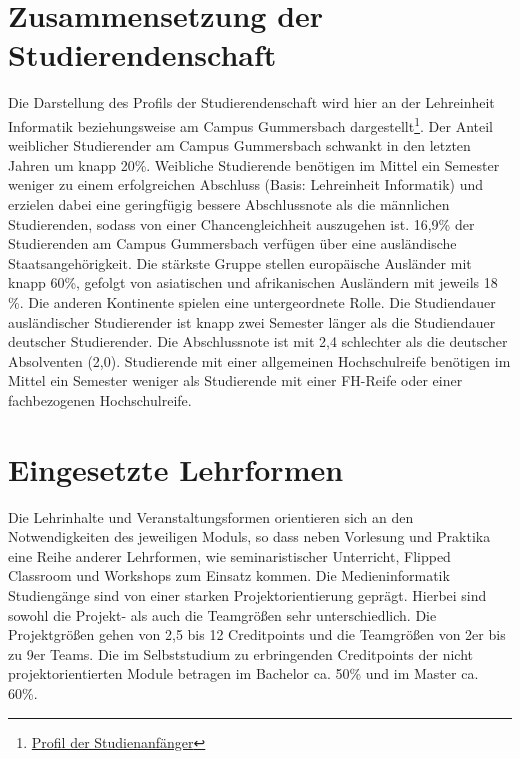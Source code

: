 \section{Zusammensetzung der
Studierendenschaft}\label{zusammensetzung-der-studierendenschaft}

Die Darstellung des Profils der Studierendenschaft wird hier an der
Lehreinheit Informatik beziehungsweise am Campus Gummersbach
dargestellt\footnote{\href{https://th-koeln.github.io/mi-2017/anhaenge/stat-profil-studienanfaenger-2017.pdf}{Profil
  der Studienanfänger}}. Der Anteil weiblicher Studierender am Campus
Gummersbach schwankt in den letzten Jahren um knapp 20\%. Weibliche
Studierende benötigen im Mittel ein Semester weniger zu einem
erfolgreichen Abschluss (Basis: Lehreinheit Informatik) und erzielen
dabei eine geringfügig bessere Abschlussnote als die männlichen
Studierenden, sodass von einer Chancengleichheit auszugehen ist. 16,9\%
der Studierenden am Campus Gummersbach verfügen über eine ausländische
Staatsangehörigkeit. Die stärkste Gruppe stellen europäische Ausländer
mit knapp 60\%, gefolgt von asiatischen und afrikanischen Ausländern mit
jeweils 18 \%. Die anderen Kontinente spielen eine untergeordnete Rolle.
Die Studiendauer ausländischer Studierender ist knapp zwei Semester
länger als die Studiendauer deutscher Studierender. Die Abschlussnote
ist mit 2,4 schlechter als die deutscher Absolventen (2,0). Studierende
mit einer allgemeinen Hochschulreife benötigen im Mittel ein Semester
weniger als Studierende mit einer FH-Reife oder einer fachbezogenen
Hochschulreife.

\section{Eingesetzte Lehrformen}\label{eingesetzte-lehrformen}

Die Lehrinhalte und Veranstaltungsformen orientieren sich an den
Notwendigkeiten des jeweiligen Moduls, so dass neben Vorlesung und
Praktika eine Reihe anderer Lehrformen, wie seminaristischer Unterricht,
Flipped Classroom und Workshops zum Einsatz kommen. Die Medieninformatik
Studiengänge sind von einer starken Projektorientierung geprägt. Hierbei
sind sowohl die Projekt- als auch die Teamgrößen sehr unterschiedlich.
Die Projektgrößen gehen von 2,5 bis 12 Creditpoints und die Teamgrößen
von 2er bis zu 9er Teams. Die im Selbststudium zu erbringenden
Creditpoints der nicht projektorientierten Module betragen im Bachelor
ca. 50\% und im Master ca. 60\%.

